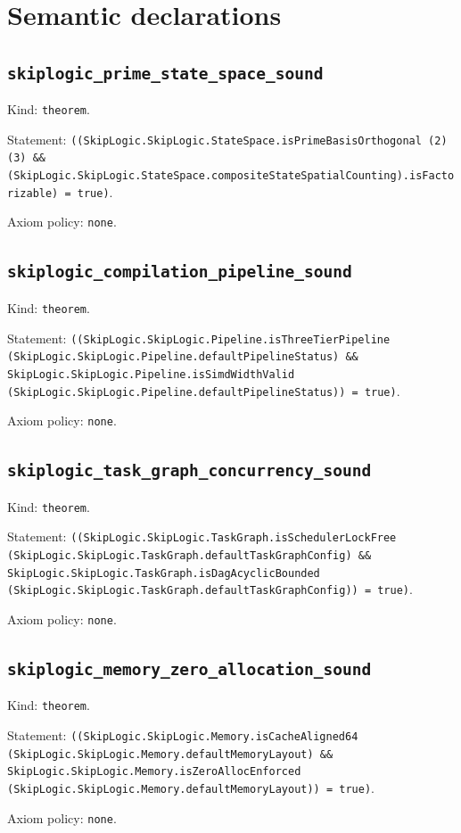 \documentclass[11pt]{article}
\begin{document}
\section*{Semantic declarations}
\subsection*{\texttt{skiplogic\_prime\_state\_space\_sound}}
\noindent Kind: \texttt{theorem}.\par
\noindent Statement: \texttt{((SkipLogic.SkipLogic.StateSpace.isPrimeBasisOrthogonal (2) (3) \&\& (SkipLogic.SkipLogic.StateSpace.compositeStateSpatialCounting).isFactorizable) = true)}.\par
\noindent Axiom policy: \texttt{none}.\par
\subsection*{\texttt{skiplogic\_compilation\_pipeline\_sound}}
\noindent Kind: \texttt{theorem}.\par
\noindent Statement: \texttt{((SkipLogic.SkipLogic.Pipeline.isThreeTierPipeline (SkipLogic.SkipLogic.Pipeline.defaultPipelineStatus) \&\& SkipLogic.SkipLogic.Pipeline.isSimdWidthValid (SkipLogic.SkipLogic.Pipeline.defaultPipelineStatus)) = true)}.\par
\noindent Axiom policy: \texttt{none}.\par
\subsection*{\texttt{skiplogic\_task\_graph\_concurrency\_sound}}
\noindent Kind: \texttt{theorem}.\par
\noindent Statement: \texttt{((SkipLogic.SkipLogic.TaskGraph.isSchedulerLockFree (SkipLogic.SkipLogic.TaskGraph.defaultTaskGraphConfig) \&\& SkipLogic.SkipLogic.TaskGraph.isDagAcyclicBounded (SkipLogic.SkipLogic.TaskGraph.defaultTaskGraphConfig)) = true)}.\par
\noindent Axiom policy: \texttt{none}.\par
\subsection*{\texttt{skiplogic\_memory\_zero\_allocation\_sound}}
\noindent Kind: \texttt{theorem}.\par
\noindent Statement: \texttt{((SkipLogic.SkipLogic.Memory.isCacheAligned64 (SkipLogic.SkipLogic.Memory.defaultMemoryLayout) \&\& SkipLogic.SkipLogic.Memory.isZeroAllocEnforced (SkipLogic.SkipLogic.Memory.defaultMemoryLayout)) = true)}.\par
\noindent Axiom policy: \texttt{none}.\par
\end{document}
